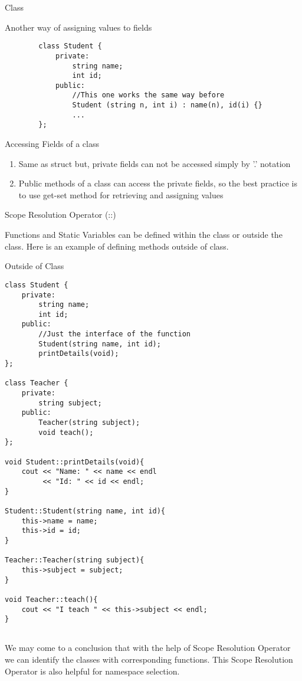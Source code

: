 \documentclass[newPxFont]{beamer}
\begin{document}
\begin{frame}{Class}
\vspace{15em}

\begin{block}{Another way of assigning values to fields}
    
    \begin{verbatim}
        class Student {
            private:
                string name;
                int id;
            public:
                //This one works the same way before
                Student (string n, int i) : name(n), id(i) {}
                ...
        };
    \end{verbatim}
    
\end{block}

    \begin{block}{Accessing Fields of a class}
        \begin{enumerate}
            \item{Same as struct but, private fields can not be accessed simply by '.' notation}
            \item{Public methods of a class can access the private fields, so the best practice is to use get-set method for retrieving and  assigning values}
        \end{enumerate}
        
    \end{block}
    

\end{frame}

\begin{frame}{Scope Resolution Operator (::)}

\alert{Functions} and \alert{Static Variables} can be defined within the class or outside the class. Here is an example of defining methods outside of class.

\alert{Outside of Class}
\begin{verbatim}
class Student {
    private:
        string name;
        int id;
    public:
        //Just the interface of the function
        Student(string name, int id);
        printDetails(void);
};

class Teacher {
    private:
        string subject;
    public:
        Teacher(string subject);
        void teach();
};

void Student::printDetails(void){
    cout << "Name: " << name << endl
         << "Id: " << id << endl;
}
    
Student::Student(string name, int id){
    this->name = name;
    this->id = id;
}

Teacher::Teacher(string subject){
    this->subject = subject;
}

void Teacher::teach(){
    cout << "I teach " << this->subject << endl;
}
    
\end{verbatim}

We may come to a conclusion that with the help of \alert{Scope Resolution Operator} we can identify the classes with corresponding functions. This Scope Resolution Operator is also helpful for namespace selection.

\end{frame}
\end{document}
